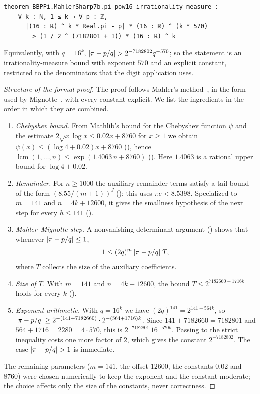 \documentclass[11pt]{amsart}
\theoremstyle{definition}
\theoremstyle{remark}
\DeclarePairedDelimiter{\abs}{\lvert}{\rvert}
\begin{document}
\begin{lstlisting}
theorem BBPPi.MahlerSharp7b.pi_pow16_irrationality_measure :
    ∀ k : ℕ, 1 ≤ k → ∀ p : ℤ,
      |(16 : ℝ) ^ k * Real.pi - p| * (16 : ℝ) ^ (k * 570)
        > (1 / 2 ^ (7182801 + 1)) * (16 : ℝ) ^ k
\end{lstlisting}

Equivalently, with $q=16^k$, $\abs{\pi-p/q}>2^{-7182802}q^{-570}$; so the
statement is an irrationality-measure bound with exponent $570$ and an explicit
constant, restricted to the denominators that the digit application uses.

\begin{proof}[Structure of the formal proof]
The proof follows Mahler's method~\cite{Mahler1953}, in the form used by
Mignotte~\cite{Mignotte1974}, with every constant explicit. We list the
ingredients in the order in which they are combined.
\begin{enumerate}
\item \emph{Chebyshev bound.} From Mathlib's bound for the Chebyshev function
  $\psi$ and the estimate $2\sqrt{x}\log x\le 0.02x+8760$ for $x\ge1$ we
  obtain $\psi(x)\le(\log4+0.02)x+8760$ (), hence
  $\operatorname{lcm}(1,\dots,n)\le\exp(1.4063\,n+8760)$
  (). Here $1.4063$ is a rational upper bound for
  $\log 4+0.02$.
\item \emph{Remainder.} For $n\ge1000$ the auxiliary remainder terms satisfy a
  tail bound of the form $(8.55/(m+1))^J$ (); this uses
  $\pi e<8.5398$. Specialized to $m=141$ and $n=4k+12600$, it gives the
  smallness hypothesis of the next step for every $h\le141$
  ().
\item \emph{Mahler--Mignotte step.} A nonvanishing determinant argument
  () shows that whenever $\abs{\pi-p/q}\le1$,
  \[
    1\le(2q)^{m}\,\abs{\pi-p/q}\;T,
  \]
  where $T$ collects the size of the auxiliary coefficients.
\item \emph{Size of $T$.} With $m=141$ and $n=4k+12600$, the bound
  $T\le2^{7182660+1716k}$ holds for every $k$ ().
\item \emph{Exponent arithmetic.} With $q=16^k$ we have
  $(2q)^{141}=2^{141+564k}$, so
  $\abs{\pi-p/q}\ge2^{-(141+7182660)}\cdot2^{-(564+1716)k}$.
  Since $141+7182660=7182801$ and $564+1716=2280=4\cdot570$, this is
  $2^{-7182801}\,16^{-570k}$. Passing to the strict inequality costs one
  more factor of $2$, which gives the constant $2^{-7182802}$. The case
  $\abs{\pi-p/q}>1$ is immediate.
\end{enumerate}
The remaining parameters ($m=141$, the offset $12600$, the constants $0.02$
and $8760$) were chosen numerically to keep the exponent and the constant
moderate; the choice affects only the size of the constants, never
correctness.
\end{proof}
\end{document}
